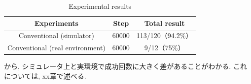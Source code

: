 \begin{table}[hbtp]
  \caption{Experimental results}
  \label{table:result_real_60000}
  \centering
  \begin{tabular}{|c|c|c|}
    \hline
    Experiments & Step & Total result\\
    \hline
    Conventional (simulator) & 60000 & 113/120（94.2\%）\\
    \hline
    Conventional (real environment) & 60000 & 9/12（75\%）\\
    \hline
  \end{tabular}
\end{table}

から, シミュレータ上と実環境で成功回数に大きく差があることがわかる. これについては, xx章で述べる.


  

  




